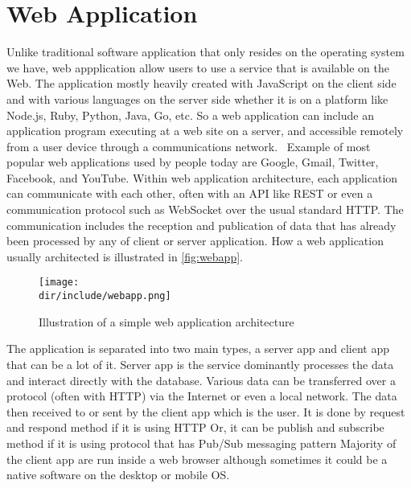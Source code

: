 \section{Web Application}
\label{sec:webapp}

Unlike traditional software application that only resides on the operating system we have, web appplication allow users to use a service that is available on the Web.
The application mostly heavily created with JavaScript on the client side and with various languages on the server side whether it is on a platform like Node.js, Ruby, Python, Java, Go, etc.
So a web application can include an application program executing at a web site on a server, and accessible remotely from a user device through a communications network.~\autocite{Addala:2013:InteractiveWebAppFramework}
Example of most popular web applications used by people today are Google, Gmail, Twitter, Facebook, and YouTube.
Within web application architecture, each application can communicate with each other, often with an \ac{API} like REST or even a communication protocol such as WebSocket over the usual standard \ac{HTTP}.
The communication includes the reception and publication of data that has already been processed by any of client or server application.
How a web application usually architected is illustrated in \autoref{fig:webapp}.

\begin{figure}[htbp]
    \centering
    \texttt{[image: \\dir/include/webapp.png]}
    \caption[Web Application Architecture]{Illustration of a simple web application architecture}
    \label{fig:webapp}
\end{figure}

The application is separated into two main types, a server app and client app that can be a lot of it.
Server app is the service dominantly processes the data and interact directly with the database.
Various data can be transferred over a protocol (often with \ac{HTTP}) via the Internet or even a local network.
The data then received to or sent by the client app which is the user.
It is done by request and respond method if it is using \ac{HTTP}
Or, it can be publish and subscribe method if it is using protocol that has \ac{Pub/Sub} messaging pattern
Majority of the client app are run inside a web browser although sometimes it could be a native software on the desktop or mobile \ac{OS}.
